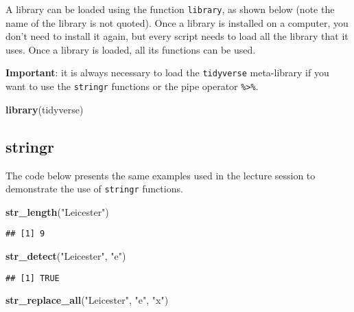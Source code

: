 \documentclass[
]{book}
\newenvironment{Shaded}{\begin{snugshade}}{\end{snugshade}}
\newcommand{\KeywordTok}[1]{\textcolor[rgb]{0.13,0.29,0.53}{\textbf{#1}}}
\newcommand{\NormalTok}[1]{#1}
\newcommand{\StringTok}[1]{\textcolor[rgb]{0.31,0.60,0.02}{#1}}
\begin{document}
A library can be loaded using the function \texttt{library}, as shown below (note the name of the library is not quoted). Once a library is installed on a computer, you don't need to install it again, but every script needs to load all the library that it uses. Once a library is loaded, all its functions can be used.

\textbf{Important}: it is always necessary to load the \texttt{tidyverse} meta-library if you want to use the \texttt{stringr} functions or the pipe operator \texttt{\%\textgreater{}\%}.

\begin{Shaded}
\begin{Highlighting}[]
\KeywordTok{library}\NormalTok{(tidyverse)}
\end{Highlighting}
\end{Shaded}

\hypertarget{stringr}{%
\subsection{stringr}\label{stringr}}

The code below presents the same examples used in the lecture session to demonstrate the use of \texttt{stringr} functions.

\begin{Shaded}
\begin{Highlighting}[]
\KeywordTok{str_length}\NormalTok{(}\StringTok{"Leicester"}\NormalTok{)}
\end{Highlighting}
\end{Shaded}

\begin{verbatim}
## [1] 9
\end{verbatim}

\begin{Shaded}
\begin{Highlighting}[]
\KeywordTok{str_detect}\NormalTok{(}\StringTok{"Leicester"}\NormalTok{, }\StringTok{"e"}\NormalTok{)}
\end{Highlighting}
\end{Shaded}

\begin{verbatim}
## [1] TRUE
\end{verbatim}

\begin{Shaded}
\begin{Highlighting}[]
\KeywordTok{str_replace_all}\NormalTok{(}\StringTok{"Leicester"}\NormalTok{, }\StringTok{"e"}\NormalTok{, }\StringTok{"x"}\NormalTok{)}
\end{Highlighting}
\end{Shaded}
\end{document}
